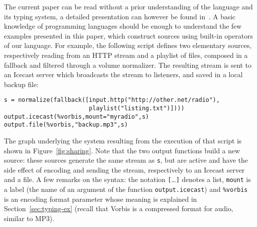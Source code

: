 \documentclass{llncs}
\newcommand{\TODO}[1]{\marginpar{\tiny #1}}
\begin{document}
The current paper can be read without a prior understanding of the language and
its typing system, a detailed presentation can however be found
in~\cite{baelde-mimram:webradio-lambda}.
A basic knowledge of programming languages should be enough to understand
the few examples presented in this paper,
which construct sources using built-in operators of our language.
For example, the following script defines two elementary sources, respectively 
reading from an HTTP stream and a playlist of files, composed in a fallback
and filtered through a volume normalizer.
The resulting stream is sent to an Icecast server which 
broadcasts the stream to listeners,
and saved in a local backup file:
\begin{verbatim}
s = normalize(fallback([input.http("http://other.net/radio"),
                        playlist("listing.txt")])))
output.icecast(%vorbis,mount="myradio",s)
output.file(%vorbis,"backup.mp3",s)
\end{verbatim}
The graph underlying the system resulting from the execution of that script is
shown in Figure~\ref{fig:sharing}.
Note that the two output functions build a new source:
these sources generate the same stream as \verb.s.,
but are active and have the side effect of encoding and sending
the stream, respectively to an Icecast server and a file.
A few remarks on the syntax: the notation
\hbox{\texttt{[}\ldots\texttt{]}} denotes a list, \texttt{mount}
is a label (the name of an argument of the function \texttt{output.icecast}) and
\texttt{\%vorbis} is an encoding format parameter whose meaning is explained in
Section~\ref{sec:typing-ex}
(recall that Vorbis is a compressed format for audio, similar to MP3).

% 
% 
\end{document}
